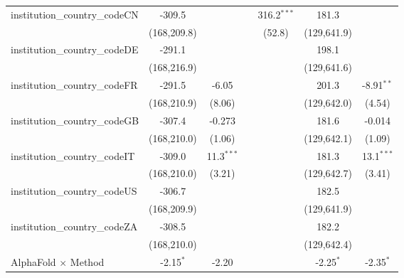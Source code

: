 \begin{tabular}{lcccccc}
   institution\_country\_codeCN          & -309.5        &               &                  & 316.2$^{***}$ & 181.3         &   \\   
                                         & (168,209.8)   &               &                  & (52.8)        & (129,641.9)   &   \\   
   institution\_country\_codeDE          & -291.1        &               &                  &               & 198.1         &   \\   
                                         & (168,216.9)   &               &                  &               & (129,641.6)   &   \\   
   institution\_country\_codeFR          & -291.5        & -6.05         &                  &               & 201.3         & -8.91$^{**}$\\   
                                         & (168,210.9)   & (8.06)        &                  &               & (129,642.0)   & (4.54)\\   
   institution\_country\_codeGB          & -307.4        & -0.273        &                  &               & 181.6         & -0.014\\   
                                         & (168,210.0)   & (1.06)        &                  &               & (129,642.1)   & (1.09)\\   
   institution\_country\_codeIT          & -309.0        & 11.3$^{***}$  &                  &               & 181.3         & 13.1$^{***}$\\   
                                         & (168,210.0)   & (3.21)        &                  &               & (129,642.7)   & (3.41)\\   
   institution\_country\_codeUS          & -306.7        &               &                  &               & 182.5         &   \\   
                                         & (168,209.9)   &               &                  &               & (129,641.9)   &   \\   
   institution\_country\_codeZA          & -308.5        &               &                  &               & 182.2         &   \\   
                                         & (168,210.0)   &               &                  &               & (129,642.4)   &   \\   
   AlphaFold $\times$ Method             & -2.15$^{*}$   & -2.20         &                  &               & -2.25$^{*}$   & -2.35$^{*}$\\   

\end{tabular}
